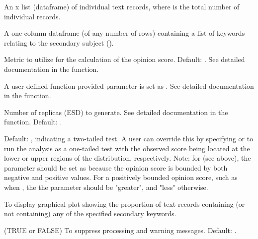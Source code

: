 \documentclass[a4paper]{book}
\begin{document}
\begin{Arguments}
\begin{ldescription}
\item[\code{textdoc}] An  x  list (dataframe) of
individual text records, where  is the total
number of individual records.

\item[\code{sec\_keywords}]  A one-column dataframe (of any
number of rows) containing a list of keywords relating to
the secondary subject ().

\item[\code{metric}]  Metric to utilize for the calculation
of the opinion score. Default: . See detailed documentation
in the  function.

\item[\code{fun}] A user-defined function provided parameter
 is set as . See detailed documentation
in the  function.

\item[\code{nsim}]  Number of replicas (ESD) to generate.
See detailed documentation in the  function.
Default: .

\item[\code{alternative}]  Default: ,
indicating a two-tailed test. A user can override
this by specifying  or  to run
the analysis as a one-tailed test with the observed score
being located at the lower or upper regions of the
distribution, respectively. Note: for 
(see above), the  parameter should be
set as  because the opinion score is
bounded by both negative and positive values. For a positively
bounded opinion score, such as when
, the the  parameter
should be "greater", and "less" otherwise.

\item[\code{pplot}]  To display graphical plot showing
the proportion of text records containing (or not
containing) any of the specified secondary keywords.

\item[\code{quiet}] (TRUE or FALSE) To suppress processing
and warning messages. Default: .
\end{ldescription}
\end{Arguments}
\end{document}
